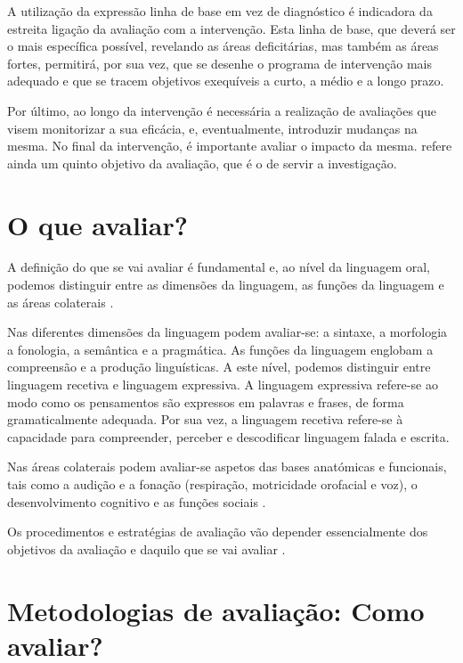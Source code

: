 \documentclass[output=paper]{LSP/langsci}
\begin{document}
A utilização da expressão linha de base em vez de diagnóstico é indicadora da estreita ligação da avaliação com a intervenção. Esta linha de base, que deverá ser o mais específica possível, revelando as áreas deficitárias, mas também as áreas fortes, permitirá, por sua vez, que se desenhe o programa de intervenção mais adequado e que se tracem objetivos exequíveis a curto, a médio e a longo prazo.

 Por último, ao longo da intervenção é necessária a realização de avaliações que visem monitorizar a sua eficácia, e, eventualmente, introduzir mudanças na mesma. No final da intervenção, é importante avaliar o impacto da mesma. \citet{puyuelo2003} refere ainda um quinto objetivo da avaliação, que é o de servir a investigação. 
 
 \section{O que avaliar?}
 \label{sec:viana_o_que}
 
A definição do que se vai avaliar é fundamental e, ao nível da linguagem oral, podemos distinguir entre as dimensões da linguagem, as funções da linguagem e as áreas colaterais \citep{paul2007}.

Nas diferentes dimensões da linguagem podem avaliar-se: a sintaxe, a morfologia a fonologia, a semântica e a pragmática. As funções da linguagem englobam a compreensão e a produção linguísticas. A este nível, podemos distinguir entre linguagem recetiva e linguagem expressiva. A linguagem expressiva refere-se ao modo como os pensamentos são expressos em palavras e frases, de forma gramaticalmente adequada. Por sua vez, a linguagem recetiva refere-se à capacidade para compreender, perceber e descodificar linguagem falada e escrita.

Nas áreas colaterais podem avaliar-se aspetos das bases anatómicas e funcionais, tais como a audição e a fonação (respiração, motricidade orofacial e voz), o desenvolvimento cognitivo e as funções sociais \citep{paul2007}. 

Os procedimentos e estratégias de avaliação vão depender essencialmente dos objetivos da avaliação e daquilo que se vai avaliar \citep{acosta2006,paul2007}. 

\section{Metodologias de avaliação: Como avaliar?}
\label{sec:viana_como}
\end{document}
